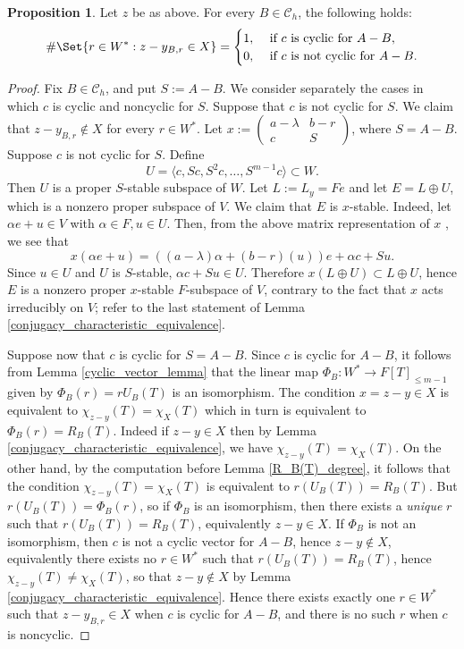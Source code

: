 \documentclass[preprint,11pt]{amsart}
\newcommand{\CalC}{\mathcal{C}}
\theoremstyle{definition}
\numberwithin{thm}{section}
\newtheorem{prop}[thm]{Proposition}
\newcommand{\ip}[1]{\langle #1 \rangle}
\newcommand{\tit}[1]{\textit{#1}}
\newcommand{\trm}[1]{\textrm{#1}}
\newcommand{\al}{\alpha}
\newcommand{\lam}{\lambda}
\newcommand{\sub}{\subset}
\begin{document}
\begin{prop}\label{cyclic_noncyclic}
Let $z$ be as above. For every $B \in \CalC_h$, the following holds:
$$
\#\Set{r \in W^* : z - y_{B,r} \in X} = \begin{cases} 1, & \trm{ if } c \trm{ is cyclic for } A-B, \\
0, & \trm{ if } c \trm{ is not cyclic for } A - B.
\end{cases}
$$
\end{prop}
\begin{proof}

Fix $B \in \CalC_h$, and put $S := A -B$. We consider separately the cases in which $c$ is cyclic and noncyclic for $S$.  Suppose that $c$ is not cyclic for $S$. We claim that $z- y_{B,r} \not \in X$ for every $r \in W^*$.
 Let $x := \begin{pmatrix} a- \lam & b - r \\ c & S \end{pmatrix}$, where $S = A  - B$. Suppose $c$ is not cyclic for $S$. Define 
$$
U = \ip{c, Sc, S^2c, \ldots, S^{m-1}c} \sub W.
$$
Then $U$ is a proper $S$-stable subspace of $W$. Let $L := L_y = Fe$ and let $E = L \oplus U$, which is a nonzero proper subspace of $V$. We claim that $E$ is $x$-stable. Indeed, let $\al e+ u  \in  V$ with $\al \in F, u \in U$. Then, from the above matrix representation of $x$	, we see that  
$$
x(\al e + u) = ((a- \lam) \al + (b-r)(u))e + \al c + Su.
$$
Since $u \in U$ and $U$ is $S$-stable, $\al c + S u \in U$. Therefore $x (L \oplus U) \sub L \oplus U$, hence $E$ is a nonzero proper $x$-stable $F$-subspace of $V$, contrary to the fact that $x$ acts irreducibly on $V$; refer to the last statement of Lemma \ref{conjugacy_characteristic_equivalence}.


Suppose now that $c$ is cyclic for $S = A - B$. 
Since $c$ is cyclic for $A-B$, it follows from Lemma \ref{cyclic_vector_lemma} that the linear map $\Phi_B : W^* \to F[T]_{\leq m-1}$ given by $\Phi_B(r) = rU_B(T)$ is an isomorphism. The condition $x = z - y \in X$ is equivalent to $\chi_{z-y} (T) = \chi_X(T)$ which in turn is equivalent to $\Phi_B(r) = R_B(T)$. Indeed if $z - y \in X$ then by Lemma \ref{conjugacy_characteristic_equivalence}, we have $\chi_{z-y}(T) = \chi_X(T)$. On the other hand, by the computation before Lemma \ref{R_B(T)_degree}, it follows that the condition $\chi_{z-y}(T) = \chi_X(T)$ is equivalent to $r(U_B(T)) = R_B(T)$. But $r(U_B(T)) = \Phi_B(r)$, so if $\Phi_B$ is an isomorphism, then there exists a \tit{unique} $r$ such that $r(U_B(T)) = R_B(T)$, equivalently $z-y \in X$. If $\Phi_B$ is not an isomorphism, then $c$ is not a cyclic vector for $A-B$, hence $z-y \not \in X$, equivalently there exists no $r \in W^*$ such that $r(U_B(T)) = R_B(T)$, hence $\chi_{z-y}(T) \neq \chi_X(T)$, so that $z-y \not \in X$ by Lemma \ref{conjugacy_characteristic_equivalence}. 
Hence there exists exactly one $r \in W^*$ such that $z-y_{B,r} \in X$  when $c$ is cyclic for $A-B$, and there is no such $r$ when $c$ is noncyclic.
 
\end{proof}
\end{document}
